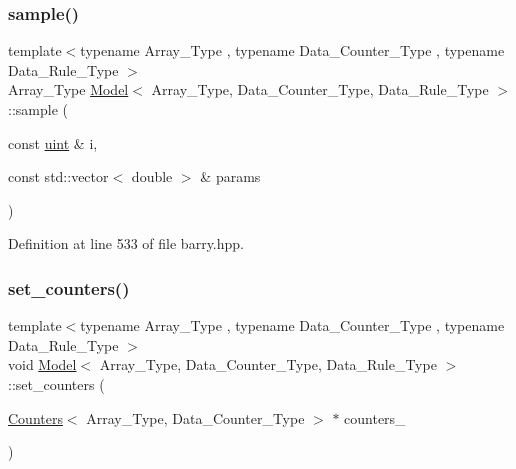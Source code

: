 \mbox{\label{classbarry_1_1_model_a7fb66a67707f610b70ee05b814373f49}} 
\subsubsection{\texorpdfstring{sample()}{sample()}\hspace{0.1cm}{\footnotesize\ttfamily [2/2]}}
{\footnotesize\ttfamily template$<$typename Array\+\_\+\+Type , typename Data\+\_\+\+Counter\+\_\+\+Type , typename Data\+\_\+\+Rule\+\_\+\+Type $>$ \\
Array\+\_\+\+Type \hyperlink{classbarry_1_1_model}{Model}$<$ Array\+\_\+\+Type, Data\+\_\+\+Counter\+\_\+\+Type, Data\+\_\+\+Rule\+\_\+\+Type $>$\+::sample (\begin{DoxyParamCaption}\item[{const \hyperlink{namespacebarry_a11dfc53ddb4672278319aa04f1e09a6c}{uint} \&}]{i,  }\item[{const std\+::vector$<$ double $>$ \&}]{params }\end{DoxyParamCaption})\hspace{0.3cm}{\ttfamily [inline]}}



Definition at line 533 of file barry.\+hpp.

\mbox{\label{classbarry_1_1_model_aab2ba8c90b888cfa2143bccf42fcb89f}} 
\subsubsection{\texorpdfstring{set\+\_\+counters()}{set\_counters()}}
{\footnotesize\ttfamily template$<$typename Array\+\_\+\+Type , typename Data\+\_\+\+Counter\+\_\+\+Type , typename Data\+\_\+\+Rule\+\_\+\+Type $>$ \\
void \hyperlink{classbarry_1_1_model}{Model}$<$ Array\+\_\+\+Type, Data\+\_\+\+Counter\+\_\+\+Type, Data\+\_\+\+Rule\+\_\+\+Type $>$\+::set\+\_\+counters (\begin{DoxyParamCaption}\item[{\hyperlink{classbarry_1_1_counters}{Counters}$<$ Array\+\_\+\+Type, Data\+\_\+\+Counter\+\_\+\+Type $>$ $\ast$}]{counters\+\_\+ }\end{DoxyParamCaption})\hspace{0.3cm}{\ttfamily [inline]}}



